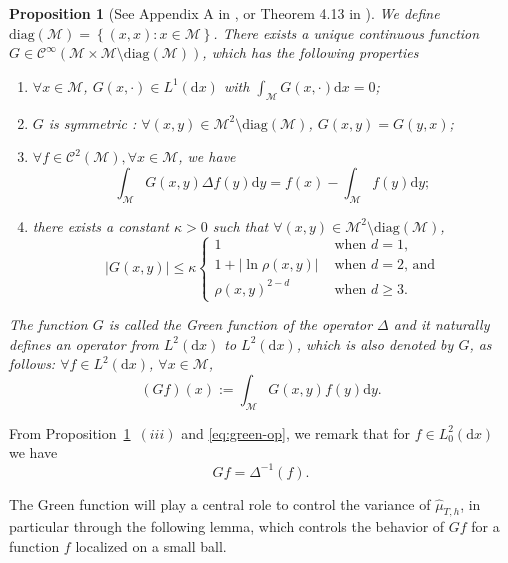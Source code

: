 \documentclass[10pt,a4paper]{article}
\newcommand\cC{\mathcal{C}}
\newcommand\cM{\mathcal{M}}
\newcommand\dd{\mathrm{d}}
\newcommand{\ABS}[1]{{{\left| #1 \right|}}} %
\newcommand{\BRA}[1]{{{\left\{#1\right\}}}} %
\newcommand{\PAR}[1]{{{\left(#1\right)}}} %
\newtheorem{proposition}[theorem]{Proposition}
\begin{document}
\begin{proposition}[See Appendix A in \cite{Alesker2013}, or Theorem 4.13 in \cite{Aubin1982}]
	\label{prop:greenfunction}
	We define $\mathrm{diag}(\cM)=\BRA{(x,x):x\in\cM}$.
	There exists a unique continuous function  $G \in\cC^{\infty}\PAR{\cM\times\cM \setminus\mathrm{diag}(\cM)}$, which has the following properties
	\begin{enumerate}[label=(\roman*)]
		\item $\forall x\in\cM$, $G(x,\cdot)\in L^1(\dd x)$  with $\displaystyle{\int_\cM G(x,\cdot)\dd x=0}$;
		\item $G$ is symmetric : $\forall (x,y)\in\cM^2\setminus\mathrm{diag}(\cM)$, $G(x,y)=G(y,x)$;
		\item $\forall f\in\cC^2(\cM), \forall x\in \cM$, we have
		\[
		\int_{\cM}G(x,y)\Delta  f(y)\dd y=f(x)-\int_{\cM}f(y)\dd y;
		\]
  \item  there exists a constant $\kappa>0$  such that $\forall(x,y)\in\cM^2\setminus \mathrm{diag}(\cM)$,
\[\ABS{G(x,y)}\le \kappa\begin{cases}
 1& \text{ when $d=1$,}\\
1+\ABS{\ln \rho(x,y)} & \text{ when $d=2$, and}\\
\rho(x,y)^{2-d}&\text{ when $d\ge 3$.}
\end{cases}\]
\end{enumerate}
	The function $G$ is called the Green function of the operator $\Delta$ and it naturally defines an operator from $L^2(\dd x)$ to $L^2(\dd x)$, which is also denoted by $G$, as follows: $\forall f\in L^2(\dd x)$, $\forall x\in \cM$,
	\begin{equation}\label{eq:green-op}
		\PAR{Gf}(x):=\int_{\cM}G(x,y)f(y)\dd y.
	\end{equation}
\end{proposition}

From Proposition~\ref{prop:greenfunction}~$(iii)$ and \eqref{eq:green-op}, we remark that for  $f\in L^2_0(\dd x)$ we have
\[
Gf=\Delta^{-1}(f).
\]


The Green function will play a central role to control the variance of $\widehat{\mu}_{T,h}$, in particular through the following lemma, which controls the behavior of $Gf$ for a function $f$ localized on a small ball.
\end{document}
